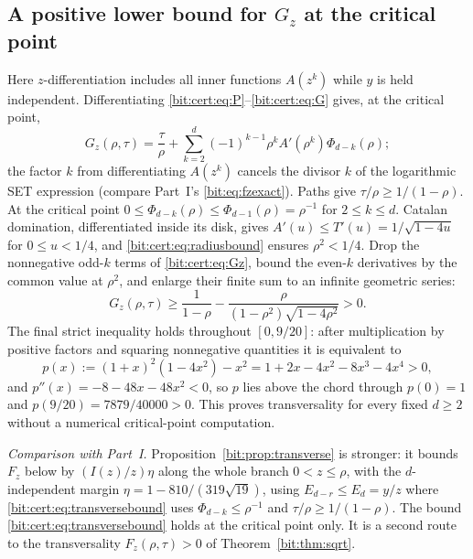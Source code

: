 \documentclass[11pt]{article}
\theoremstyle{definition}\newtheorem{definition}[theorem]{Definition}
\theoremstyle{remark}\newtheorem{remark}[theorem]{Remark}
\begin{document}
\subsection{A positive lower bound for \texorpdfstring{$G_z$}{Gz} at the critical point}
Here $z$-differentiation includes all inner functions $A(z^k)$ while $y$ is
held independent. Differentiating \eqref{bit:cert:eq:P}--\eqref{bit:cert:eq:G}
gives, at the critical point,
\begin{equation}\label{bit:cert:eq:Gz}
 G_z(\rho,\tau)=\frac\tau\rho+
  \sum_{k=2}^d(-1)^{k-1}\rho^kA'(\rho^k)\Phi_{d-k}(\rho);
\end{equation}
the factor $k$ from differentiating $A(z^k)$ cancels the divisor $k$ of the
logarithmic SET expression (compare Part~I's \eqref{bit:eq:fzexact}). Paths
give $\tau/\rho\ge1/(1-\rho)$. At the critical point
$0\le\Phi_{d-k}(\rho)\le\Phi_{d-1}(\rho)=\rho^{-1}$ for $2\le k\le d$. Catalan
domination, differentiated inside its disk, gives
$A'(u)\le T'(u)=1/\sqrt{1-4u}$ for $0\le u<1/4$, and
\eqref{bit:cert:eq:radiusbound} ensures $\rho^2<1/4$. Drop the nonnegative
odd-$k$ terms of \eqref{bit:cert:eq:Gz}, bound the even-$k$ derivatives by the
common value at $\rho^2$, and enlarge their finite sum to an infinite
geometric series:
\begin{equation}\label{bit:cert:eq:transversebound}
 G_z(\rho,\tau)\ge
 \frac1{1-\rho}-\frac{\rho}{(1-\rho^2)\sqrt{1-4\rho^2}}>0.
\end{equation}
The final strict inequality holds throughout $[0,9/20]$: after multiplication
by positive factors and squaring nonnegative quantities it is equivalent to
\[
 p(x):=(1+x)^2(1-4x^2)-x^2=1+2x-4x^2-8x^3-4x^4>0,
\]
and $p''(x)=-8-48x-48x^2<0$, so $p$ lies above the chord through
$p(0)=1$ and $p(9/20)=7879/40000>0$. This proves transversality for every
fixed $d\ge2$ without a numerical critical-point computation.

\emph{Comparison with Part~I.} Proposition~\ref{bit:prop:transverse} is
stronger: it bounds $F_z$ below by $(I(z)/z)\eta$ along the whole branch
$0<z\le\rho$, with the $d$-independent margin $\eta=1-810/(319\sqrt{19})$,
using $E_{d-r}\le E_d=y/z$ where \eqref{bit:cert:eq:transversebound} uses
$\Phi_{d-k}\le\rho^{-1}$ and $\tau/\rho\ge1/(1-\rho)$. The bound
\eqref{bit:cert:eq:transversebound} holds at the critical point only. It is a
second route to the transversality $F_z(\rho,\tau)>0$ of
Theorem~\ref{bit:thm:sqrt}.
\end{document}
